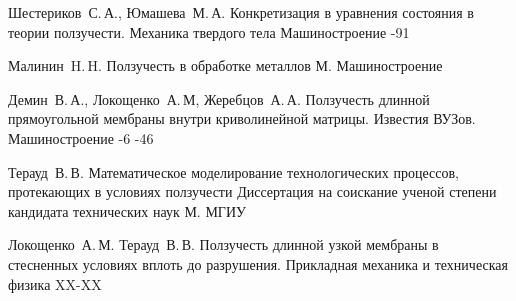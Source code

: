 \renewcommand{\bibname}{Список источников}
\begin{thebibliography}{2013}
\label{shest}
\by Шестериков~С.\,А., Юмашева~М.\,А.
\paper Конкретизация в уравнения состояния в теории ползучести.
\jour Механика твердого тела
\publ Машиностроение
-91


\label{malinin}
\by Малинин~H.\,H.
\book Ползучесть в обработке металлов
\publaddr М.
\publ Машиностроение

\label{jerebcov}
	\by Демин~В.\,А., Локощенко~А.\,М, Жеребцов~А.\,А. 
	\paper Ползучесть длинной прямоугольной мембраны внутри криволинейной матрицы. 
	\jour Известия ВУЗов. Машиностроение
	-6
	-46

	
\label{teraud_dis}
	\by Терауд~В.\,В.
	\book Математическое моделирование технологических процессов, протекающих в условиях ползучести
	\publ Диссертация на соискание ученой степени кандидата технических наук
	\publaddr М. МГИУ

\label{teraud}
	\by Локощенко~А.\,М. Терауд~В.\,В. 
	\paper Ползучесть длинной узкой мембраны в стесненных условиях вплоть до разрушения.
	\jour Прикладная механика и техническая физика	
	\pages XX-XX

\end{thebibliography}

\endinput
